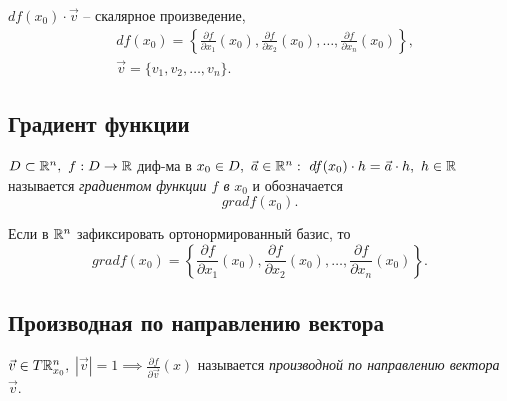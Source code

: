 \begin{note}
    $ df(x_0)\cdot \vec{v} $ -- скалярное произведение,
    \begin{align*}
         & df(x_0) = \left\{\frac{\partial f}{\partial x_1}(x_0), \frac{\partial f}{\partial x_2}(x_0), \ldots, \frac{\partial f}{\partial x_n}(x_0)\right\}, \\
         & \vec{v} = \{v_1,v_2,\ldots,v_n\}.
    \end{align*}
\end{note}

\subsection{Градиент функции}

\begin{definition}
    $ D \subset \mathbb{R}^n, \ f:D\rightarrow \mathbb{R} $ диф-ма в $x_0 \in D, \ \vec{a} \in \mathbb{R}^n: \ df(x_0)\cdot h = \vec{a} \cdot h, \ h \in \mathbb{R}$ называется \emph{градиентом функции $f$ в} $x_0$ и обозначается
    \[
        gradf(x_0).
    \]
\end{definition}

\begin{note}
    Если в $\mathbb{R}^n$ зафиксировать ортонормированный базис, то
    \[
        gradf(x_0) = \left\{\frac{\partial f}{\partial x_1}(x_0),\frac{\partial f}{\partial x_2}(x_0),\ldots,\frac{\partial f}{\partial x_n}(x_0)\right\}.
    \]
\end{note}

\newpage

\subsection{Производная по направлению вектора}

\begin{definition}
    $ \vec{v}\in T\mathbb{R}_{x_0}^n, $ $ |\vec{v}| = 1 \implies \frac{\partial f}{\partial \vec{v}}(x) $ называется \emph{производной по направлению вектора} $ \vec{v} $.
\end{definition}